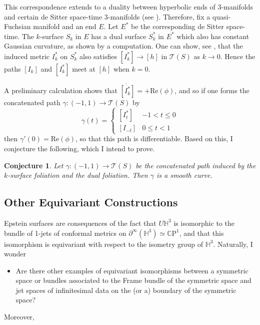 \documentclass[11pt]{amsart}
\newcommand{\CP}{\mathbb{C}\mathrm{P}}
\renewcommand{\H}{\mathbb{H}}
\newtheorem*{conj*}{Conjecture}
\begin{document}
This correspondence extends to a duality between hyperbolic ends of 3-manifolds and certain de Sitter space-time 3-manifolds (see \cite{mess2007}).
Therefore, fix a quasi-Fuchsian manifold and an end $E$.
Let $E^*$ be the corresponding de Sitter space-time.
The $k$-surface $S_k$ in $E$ has a dual surface $S_k^*$ in $E^*$ which also has constant Gaussian curvature, as shown by a computation. 
One can show, see \cite{labourie1992}, that the induced metric $I_k^*$ on $S_k^*$ also satisfies $[I_k^*] \to [h]$ in $\mathcal{T}(S)$ as $k \to 0$. 
Hence the paths $[I_k]$ and $[I_k^*]$ meet at $[h]$ when $k = 0$. 

A preliminary calculation shows that $\dot{[I_k^*]} = +\mathrm{Re}(\phi)$, and so if one forms the concatenated path $\gamma : (-1,1) \to \mathcal{T}(S)$ by 
\[
\gamma(t) = 
\begin{cases}
[I_t^*]  & -1 < t \leq 0 \\
[I_{-t}] & 0 \leq t < 1
\end{cases}
\]
then $\gamma'(0) = \mathrm{Re}(\phi)$, so that this path is differentiable. 
Based on this, I conjecture the following, which I intend to prove.

\begin{conj*}
\label{deSitter path}
Let $\gamma: (-1,1) \to \mathcal{T}(S)$ be the concatenated path induced by the $k$-surface foliation and the dual foliation. 
Then $\gamma$ is a smooth curve. 
\end{conj*}


\subsection{Other Equivariant Constructions}

Epstein surfaces are consequences of the fact that $U\H^3$ is isomorphic to the bundle of 1-jets of conformal metrics on $\partial^\infty( \H^3) \simeq \CP^1$, and that this isomorphism is equivariant with respect to the isometry group of $\H^3$. 
Naturally, I wonder
\begin{itemize}

\item Are there other examples of equivariant isomorphisms between a symmetric space or bundles associated to the Frame bundle of the symmetric space and jet spaces of infinitesimal data on the (or a) boundary of the symmetric space? 

\end{itemize}

Moreover, 
\end{document}
